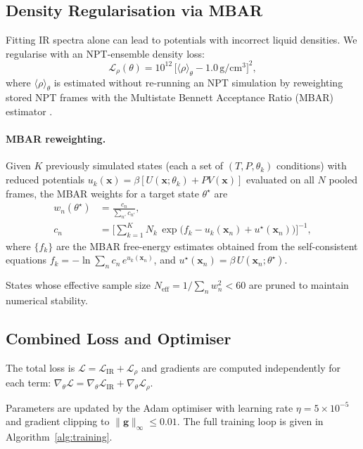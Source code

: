 \documentclass{article}
\newcommand{\MBAR}{\textsc{MBAR}}
\begin{document}
\subsection{Density Regularisation via MBAR}
\label{sec:mbar}

Fitting IR spectra alone can lead to potentials with incorrect liquid densities.
We regularise with an NPT-ensemble density loss:
\begin{equation}
  \label{eq:densloss}
  \mathcal{L}_\rho(\theta)
  = 10^{12}\,\bigl[\langle\rho\rangle_\theta - 1.0\,\mathrm{g/cm^3}\bigr]^2,
\end{equation}
where $\langle\rho\rangle_\theta$ is estimated without re-running an NPT
simulation by reweighting stored NPT frames with the Multistate Bennett
Acceptance Ratio (\MBAR) estimator \cite{mbar2008}.

\paragraph{MBAR reweighting.}
Given $K$ previously simulated states (each a set of $(T, P, \theta_k)$
conditions) with reduced potentials
$u_k(\bm{x}) = \beta[U(\bm{x};\theta_k) + PV(\bm{x})]$
evaluated on all $N$ pooled frames, the MBAR weights for a target state
$\theta^\star$ are
\begin{align}
  \label{eq:mbar}
  w_n(\theta^\star) &=
    \frac{c_n}{\sum_{n'} c_{n'}}, \\
  c_n &= \Biggl[\sum_{k=1}^K N_k\,
          \exp\!\bigl(f_k - u_k(\bm{x}_n) + u^\star(\bm{x}_n)\bigr)
         \Biggr]^{-1},
\end{align}
where $\{f_k\}$ are the MBAR free-energy estimates obtained from the
self-consistent equations $f_k = -\ln\sum_n c_n\,e^{u_k(\bm{x}_n)}$,
and $u^\star(\bm{x}_n) = \beta\,U(\bm{x}_n;\theta^\star)$.

States whose effective sample size
$N_\mathrm{eff} = 1/\sum_n w_n^2 < 60$ are pruned to maintain numerical
stability.

\subsection{Combined Loss and Optimiser}

The total loss is $\mathcal{L} = \mathcal{L}_\mathrm{IR} + \mathcal{L}_\rho$
and gradients are computed independently for each term:
$\nabla_\theta\mathcal{L} = \nabla_\theta\mathcal{L}_\mathrm{IR}
+ \nabla_\theta\mathcal{L}_\rho$.

Parameters are updated by the Adam optimiser with learning rate
$\eta = 5\times10^{-5}$ and gradient clipping to
$\|\bm{g}\|_\infty \le 0.01$.  The full training loop is given in
Algorithm~\ref{alg:training}.
\end{document}
